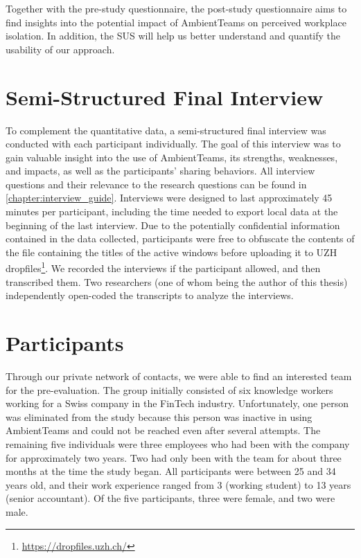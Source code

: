 Together with the pre-study questionnaire, the post-study questionnaire aims to find insights into the potential impact of AmbientTeams on perceived workplace isolation. In addition, the SUS will help us better understand and quantify the usability of our approach.

\section{Semi-Structured Final Interview}
\label{section:interview}
To complement the quantitative data, a semi-structured final interview was conducted with each participant individually. The goal of this interview was to gain valuable insight into the use of AmbientTeams, its strengths, weaknesses, and impacts, as well as the participants' sharing behaviors. All interview questions and their relevance to the research questions can be found in \autoref{chapter:interview_guide}. Interviews were designed to last approximately 45 minutes per participant, including the time needed to export local data at the beginning of the last interview. Due to the potentially confidential information contained in the data collected, participants were free to obfuscate the contents of the file containing the titles of the active windows before uploading it to UZH dropfiles\footnote{\url{https://dropfiles.uzh.ch/}}. We recorded the interviews if the participant allowed, and then transcribed them. Two researchers (one of whom being the author of this thesis) independently open-coded the transcripts to analyze the interviews.

\section{Participants}
Through our private network of contacts, we were able to find an interested team for the pre-evaluation. The group initially consisted of six knowledge workers working for a Swiss company in the FinTech industry. Unfortunately, one person was eliminated from the study because this person was inactive in using AmbientTeams and could not be reached even after several attempts. The remaining five individuals were three employees who had been with the company for approximately two years. Two had only been with the team for about three months at the time the study began. All participants were between 25 and 34 years old, and their work experience ranged from 3 (working student) to 13 years (senior accountant). Of the five participants, three were female, and two were male.